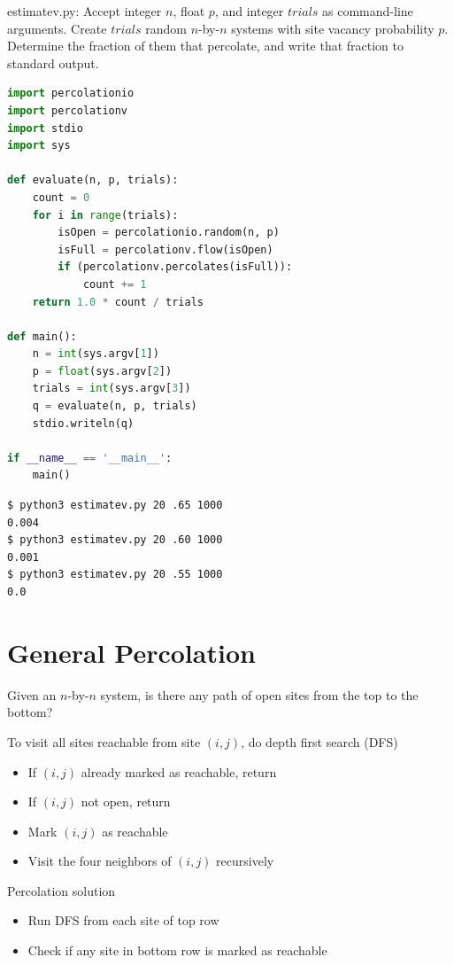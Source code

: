 \documentclass[8pt,a4paper,compress]{beamer}
\begin{document}
\begin{frame}[fragile]
\pause

\begin{framed}
\tiny estimatev.py: Accept integer $n$, float $p$, and integer $trials$ as command-line arguments. Create $trials$ random $n$-by-$n$ systems with site vacancy probability $p$. Determine the fraction of them that percolate, and
write that fraction to standard output.
\end{framed}

\begin{lstlisting}[language=Python]
import percolationio
import percolationv
import stdio
import sys

def evaluate(n, p, trials):
    count = 0
    for i in range(trials):
        isOpen = percolationio.random(n, p)
        isFull = percolationv.flow(isOpen)
        if (percolationv.percolates(isFull)):
            count += 1
    return 1.0 * count / trials

def main():
    n = int(sys.argv[1])
    p = float(sys.argv[2])
    trials = int(sys.argv[3])
    q = evaluate(n, p, trials)
    stdio.writeln(q)
    
if __name__ == '__main__': 
    main()
\end{lstlisting}

\pause

\begin{lstlisting}[language={}]
$ python3 estimatev.py 20 .65 1000
0.004
$ python3 estimatev.py 20 .60 1000
0.001
$ python3 estimatev.py 20 .55 1000
0.0
\end{lstlisting}
\end{frame}

\section{General Percolation}
\begin{frame}[fragile]
\pause

Given an $n$-by-$n$ system, is there any path of open sites from the top to the bottom?

\pause
\bigskip

To visit all sites reachable from site $(i, j)$, do depth first search (DFS)
\begin{itemize}
\item If $(i, j)$ already marked as reachable, return
\item If $(i, j)$ not open, return
\item Mark $(i, j)$ as reachable
\item Visit the four neighbors of $(i, j)$ recursively
\end{itemize}

\pause
\bigskip

Percolation solution
\begin{itemize}
\item Run DFS from each site of top row
\item Check if any site in bottom row is marked as reachable
\end{itemize}
\end{frame}
\end{document}
